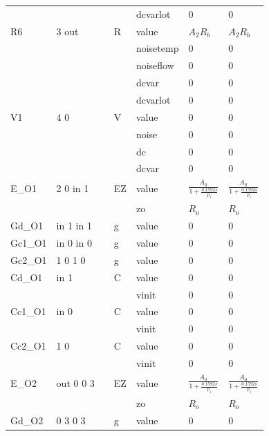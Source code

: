 \begin{table}[h]
\begin{tabular}[c]{lllllll}
\rowcolor{myyellow}
 & & & &\small{dcvarlot} &$0$ &$0$ \\ 
\small{R6} &\small{3 out } & &\small{R} &\small{value} &$A_{2} R_{b}$ &$A_{2} R_{b}$ \\ 
\rowcolor{myyellow}
 & & & &\small{noisetemp} &$0$ &$0$ \\ 
 & & & &\small{noiseflow} &$0$ &$0$ \\ 
\rowcolor{myyellow}
 & & & &\small{dcvar} &$0$ &$0$ \\ 
 & & & &\small{dcvarlot} &$0$ &$0$ \\ 
\rowcolor{myyellow}
\small{V1} &\small{4 0 } & &\small{V} &\small{value} &$0$ &$0$ \\ 
 & & & &\small{noise} &$0$ &$0$ \\ 
\rowcolor{myyellow}
 & & & &\small{dc} &$0$ &$0$ \\ 
 & & & &\small{dcvar} &$0$ &$0$ \\ 
\rowcolor{myyellow}
\small{E\_O1} &\small{2 0 in 1 } & &\small{EZ} &\small{value} &$\frac{A_{0}}{1 + \frac{0.1592 s}{p_{1}}}$ &$\frac{A_{0}}{1 + \frac{0.1592 s}{p_{1}}}$ \\ 
 & & & &\small{zo} &$R_{o}$ &$R_{o}$ \\ 
\rowcolor{myyellow}
\small{Gd\_O1} &\small{in 1 in 1 } & &\small{g} &\small{value} &$0$ &$0$ \\ 
\small{Gc1\_O1} &\small{in 0 in 0 } & &\small{g} &\small{value} &$0$ &$0$ \\ 
\rowcolor{myyellow}
\small{Gc2\_O1} &\small{1 0 1 0 } & &\small{g} &\small{value} &$0$ &$0$ \\ 
\small{Cd\_O1} &\small{in 1 } & &\small{C} &\small{value} &$0$ &$0$ \\ 
\rowcolor{myyellow}
 & & & &\small{vinit} &$0$ &$0$ \\ 
\small{Cc1\_O1} &\small{in 0 } & &\small{C} &\small{value} &$0$ &$0$ \\ 
\rowcolor{myyellow}
 & & & &\small{vinit} &$0$ &$0$ \\ 
\small{Cc2\_O1} &\small{1 0 } & &\small{C} &\small{value} &$0$ &$0$ \\ 
\rowcolor{myyellow}
 & & & &\small{vinit} &$0$ &$0$ \\ 
\small{E\_O2} &\small{out 0 0 3 } & &\small{EZ} &\small{value} &$\frac{A_{0}}{1 + \frac{0.1592 s}{p_{1}}}$ &$\frac{A_{0}}{1 + \frac{0.1592 s}{p_{1}}}$ \\ 
\rowcolor{myyellow}
 & & & &\small{zo} &$R_{o}$ &$R_{o}$ \\ 
\small{Gd\_O2} &\small{0 3 0 3 } & &\small{g} &\small{value} &$0$ &$0$ \\ 

\end{tabular}
\end{table}
